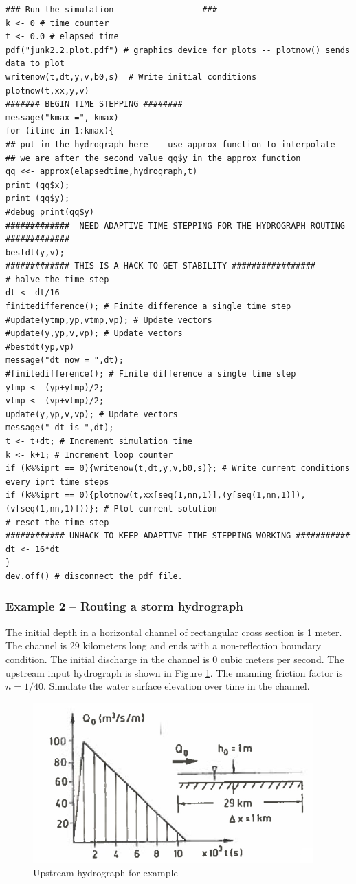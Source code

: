 \begin{verbatim}
### Run the simulation                  ###
k <- 0 # time counter
t <- 0.0 # elapsed time
pdf("junk2.2.plot.pdf") # graphics device for plots -- plotnow() sends data to plot
writenow(t,dt,y,v,b0,s)  # Write initial conditions
plotnow(t,xx,y,v)
####### BEGIN TIME STEPPING ########
message("kmax =", kmax)
for (itime in 1:kmax){
## put in the hydrograph here -- use approx function to interpolate
## we are after the second value qq$y in the approx function
qq <<- approx(elapsedtime,hydrograph,t)
print (qq$x);
print (qq$y);
#debug print(qq$y) 
#############  NEED ADAPTIVE TIME STEPPING FOR THE HYDROGRAPH ROUTING #############
bestdt(y,v);
############# THIS IS A HACK TO GET STABILITY #################
# halve the time step 
dt <- dt/16 
finitedifference(); # Finite difference a single time step
#update(ytmp,yp,vtmp,vp); # Update vectors
#update(y,yp,v,vp); # Update vectors
#bestdt(yp,vp)
message("dt now = ",dt);
#finitedifference(); # Finite difference a single time step
ytmp <- (yp+ytmp)/2;
vtmp <- (vp+vtmp)/2;
update(y,yp,v,vp); # Update vectors
message(" dt is ",dt);
t <- t+dt; # Increment simulation time
k <- k+1; # Increment loop counter
if (k%%iprt == 0){writenow(t,dt,y,v,b0,s)}; # Write current conditions every iprt time steps
if (k%%iprt == 0){plotnow(t,xx[seq(1,nn,1)],(y[seq(1,nn,1)]),(v[seq(1,nn,1)]))}; # Plot current solution
# reset the time step
############ UNHACK TO KEEP ADAPTIVE TIME STEPPING WORKING ###########
dt <- 16*dt
}
dev.off() # disconnect the pdf file.
\end{verbatim}

\subsubsection{Example 2 -- Routing a storm hydrograph}
The initial depth in a horizontal channel of rectangular cross section is 1 meter.
The channel is 29 kilometers long and ends with a non-reflection boundary condition.
The initial discharge in the channel is 0 cubic meters per second.
The upstream input hydrograph is shown in Figure \ref{fig:upstreamHydro}.
The manning friction factor is $n=1/40$.  
Simulate the water surface elevation over time in the channel.

\begin{figure}[h!] %
   \centering
   \includegraphics[width=4.25in]{./14-UnsteadyOpenChannel/upstreamHydro.jpg} 
   \caption{Upstream hydrograph for example}
   \label{fig:upstreamHydro}
\end{figure}

